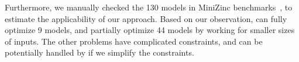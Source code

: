 Furthermore, 
we manually checked the 130 models in MiniZinc benchmarks~\cite{min}, to estimate the applicability of our approach. Based on our observation,   
\tool can fully optimize 9 models, and partially optimize 44 models by working for smaller sizes of inputs. The other problems have complicated constraints, and can be potentially handled by \tool if we simplify the constraints.







